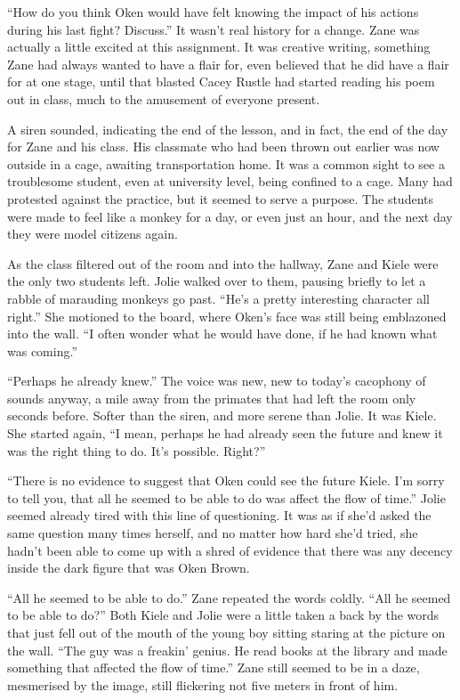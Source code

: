 ``How do you think Oken would have felt knowing the impact of his actions during his last fight?  Discuss.''  It wasn't real history for a change.  Zane was actually a little excited at this assignment.  It was creative writing, something Zane had always wanted to have a flair for, even believed that he did have a flair for at one stage, until that blasted Cacey Rustle had started reading his poem out in class, much to the amusement of everyone present.

A siren sounded, indicating the end of the lesson, and in fact, the end of the day for Zane and his class.  His classmate who had been thrown out earlier was now outside in a cage, awaiting transportation home.  It was a common sight to see a troublesome student, even at university level, being confined to a cage.  Many had protested against the practice, but it seemed to serve a purpose.  The students were made to feel like a monkey for a day, or even just an hour, and the next day they were model citizens again.

As the class filtered out of the room and into the hallway, Zane and Kiele were the only two students left.  Jolie walked over to them, pausing briefly to let a rabble of marauding monkeys go past.  ``He's a pretty interesting character all right.''  She motioned to the board, where Oken's face was still being emblazoned into the wall.  ``I often wonder what he would have done, if he had known what was coming.''

``Perhaps he already knew.''  The voice was new, new to today's cacophony of sounds anyway, a mile away from the primates that had left the room only seconds before.  Softer than the siren, and more serene than Jolie.  It was Kiele.  She started again, ``I mean, perhaps he had already seen the future and knew it was the right thing to do.  It's possible.  Right?''

``There is no evidence to suggest that Oken could see the future Kiele.  I'm sorry to tell you, that all he seemed to be able to do was affect the flow of time.''  Jolie seemed already tired with this line of questioning.  It was as if she'd asked the same question many times herself, and no matter how hard she'd tried, she hadn't been able to come up with a shred of evidence that there was any decency inside the dark figure that was Oken Brown.

``All he seemed to be able to do.''  Zane repeated the words coldly.  ``All he seemed to be able to do?''  Both Kiele and Jolie were a little taken a back by the words that just fell out of the mouth of the young boy sitting staring at the picture on the wall.  ``The guy was a freakin' genius.  He read books at the library and made something that affected the flow of time.''  Zane still seemed to be in a daze, mesmerised by the image, still flickering not five meters in front of him.

